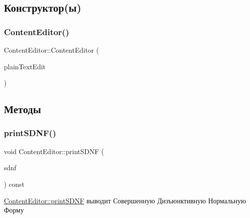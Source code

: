 \subsection{Конструктор(ы)}
\mbox{\label{class_content_editor_a7254201f7630aa7c3048f5ff5f7b8bd1}} 
\subsubsection{\texorpdfstring{Content\+Editor()}{ContentEditor()}}
{\footnotesize\ttfamily Content\+Editor\+::\+Content\+Editor (\begin{DoxyParamCaption}\item[{Q\+Plain\+Text\+Edit $\ast$}]{plain\+Text\+Edit }\end{DoxyParamCaption})}



\subsection{Методы}
\mbox{\label{class_content_editor_a929362122ef024a5b4ddc180f8af3423}} 
\subsubsection{\texorpdfstring{print\+S\+D\+N\+F()}{printSDNF()}}
{\footnotesize\ttfamily void Content\+Editor\+::print\+S\+D\+NF (\begin{DoxyParamCaption}\item[{const Q\+String \&}]{sdnf }\end{DoxyParamCaption}) const}



\hyperlink{class_content_editor_a929362122ef024a5b4ddc180f8af3423}{Content\+Editor\+::print\+S\+D\+NF} выводит Совершенную Дизъюнктивную Нормальную Форму 


